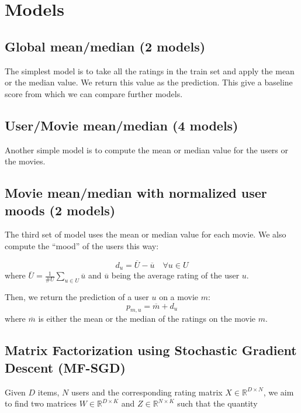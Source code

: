 \documentclass[10pt,conference,compsocconf]{IEEEtran}
\begin{document}
\section{Models}

\subsection{Global mean/median (2 models)}

The simplest model is to take all the ratings in the train set and apply the mean or the median value. We return this value as the prediction. This give a baseline score from which we can compare further models.

\subsection{User/Movie mean/median (4 models)}

Another simple model is to compute the mean or median value for the users or the movies.

\subsection{Movie mean/median with normalized user moods (2 models)}

The third set of model uses the mean or median value for each movie. We also compute the ``mood'' of the users this way:

\begin{equation}
 d_u = \overline{U} - \overline{u} \quad \forall u\in U
\end{equation}
where $\overline{U} = \frac{1}{\#U} \sum_{u\in U} \overline{u}$ and $\overline{u}$ being the average rating of the user $u$.

Then, we return the prediction of a user $u$ on a movie $m$:
\begin{equation}
 p_{m,u} = \overline{m} + d_u
\end{equation}
where $\overline{m}$ is either the mean or the median of the ratings on the movie $m$.

\subsection{Matrix Factorization using Stochastic Gradient Descent (MF-SGD)}
\label{sec:mf-sgd}
Given $D$ items, $N$ users and the corresponding rating matrix 
$X \in \mathbb{R}^{D \times N}$, we aim to find two matrices $W \in \mathbb{R}^{D \times K}$ and $Z
\in \mathbb{R}^{N \times K}$ such that the quantity 
\end{document}
